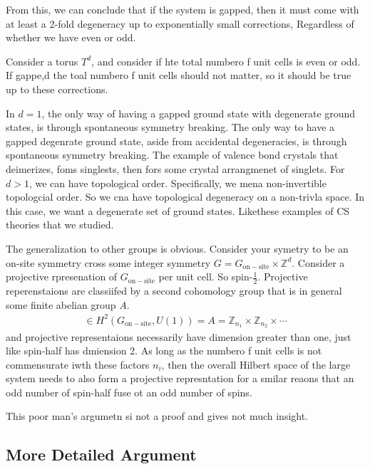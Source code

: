 From this,
we can conclude that if the system is gapped,
then it must come with at least a 2-fold degeneracy up to exponentially small
corrections,
Regardless of whether we have even or odd.

Consider a torus $T^d$,
and consider if hte total numbero f unit cells is even or odd.
If gappe,d
the toal numbero f unit cells should not matter,
so it should be true up to these corrections.

In $d=1$,
the only way of having a gapped ground state with degenerate ground states,
is through spontaneous symmetry breaking.
The only way to have a gapped degenrate ground state,
aside from accidental degeneracies,
is through spontaneous symmetry breaking.
The example of valence bond crystals that deimerizes,
foms singlests,
then fors some crystal arrangmenet of singlets.
For $d>1$,
we can have topological order.
Specifically,
we mena non-invertible topologcial order.
So we cna have topological degeneracy on a non-trivla space.
In this case,
we want a degenerate set of ground states.
Likethese examples of CS theories that we studied.

The generalization to other groups is obvious.
Consider your symetry to be an on-site symmetry cross some integer symmetry
$G = G_{\mathrm{on-site}}\times \mathbb{Z}^d$.
Consider a projective rpresenation of $G_{\mathrm{on-site}}$ per unit cell.
So spin-$\frac{1}{2}$.
Projective reperenstaions are classiifed by a second cohomology group that is in
general some finite abelian group $A$.
\begin{align}
    [w]
    \in H^2\left( G_{\mathrm{on-site}}, U(1) \right)
    = A = \mathbb{Z}_{n_1}\times\mathbb{Z}_{n_2}\times\cdots
\end{align}
and projective representaions necessarily have dimension greater than one,
just like spin-half has dmiension 2.
As long as the numbero f unit cells is not commensurate iwth these factors
$n_i$,
then the overall Hilbert space of the large system needs to also form a
projective represntation for a smilar reaons that an odd number of spin-half
fuse ot an odd number of spins.

This poor man's argumetn si not a proof and gives not much insight.

\subsection{More Detailed Argument}

